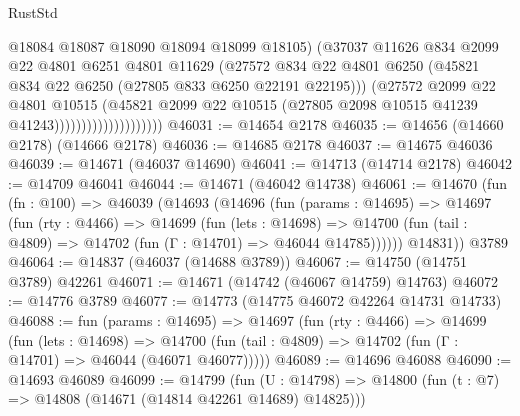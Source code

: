 \begin{lexlean}{RustStd}
\begin{coremodule}
                                      @18084
                                      @18087
                                      @18090
                                      @18094
                                      @18099
                                      @18105)
                                    (@37037
                                      @11626
                                      @834
                                      @2099
                                      @22
                                      @4801
                                      @6251
                                      @4801
                                      @11629
                                      (@27572
                                        @834
                                        @22
                                        @4801
                                        @6250
                                        (@45821 @834 @22 @6250 (@27805 @833 @6250 @22191 @22195)))
                                      (@27572
                                        @2099
                                        @22
                                        @4801
                                        @10515
                                        (@45821
                                          @2099
                                          @22
                                          @10515
                                          (@27805 @2098 @10515 @41239 @41243))))))))))))))))))))
@46031 := @14654 @2178
@46035 := @14656 (@14660 @2178) (@14666 @2178)
@46036 := @14685 @2178
@46037 := @14675 @46036
@46039 := @14671 (@46037 @14690)
@46041 := @14713 (@14714 @2178)
@46042 := @14709 @46041
@46044 := @14671 (@46042 @14738)
@46061 := @14670
    (fun (fn : @100) =>
    @46039
      (@14693
        (@14696
          (fun (params : @14695) =>
          @14697
            (fun (rty : @4466) =>
            @14699
              (fun (lets : @14698) =>
              @14700 (fun (tail : @4809) => @14702 (fun (Γ : @14701) => @46044 @14785))))))
        @14831))
    @3789
@46064 := @14837 (@46037 (@14688 @3789))
@46067 := @14750 (@14751 @3789) @42261
@46071 := @14671 (@14742 (@46067 @14759) @14763)
@46072 := @14776 @3789
@46077 := @14773 (@14775 @46072 @42264 @14731 @14733)
@46088 := fun (params : @14695) =>
  @14697
    (fun (rty : @4466) =>
    @14699
      (fun (lets : @14698) =>
      @14700 (fun (tail : @4809) => @14702 (fun (Γ : @14701) => @46044 (@46071 @46077)))))
@46089 := @14696 @46088
@46090 := @14693 @46089
@46099 := @14799
    (fun (U : @14798) => @14800 (fun (t : @7) => @14808 (@14671 (@14814 @42261 @14689) @14825)))

\end{coremodule}
\end{lexlean}
